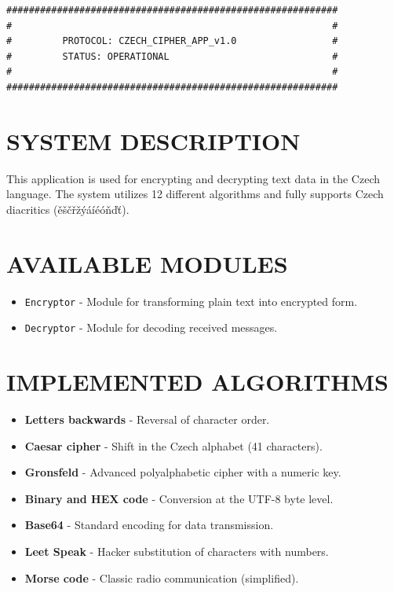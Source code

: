 \documentclass[12pt]{article}
\begin{document}
\large

\begin{center}
\begin{Verbatim}[formatcom=\color{text_zelena}, fontsize=\Large]
###########################################################
#                                                         #
#         PROTOCOL: CZECH_CIPHER_APP_v1.0                 #
#         STATUS: OPERATIONAL                             #
#                                                         #
###########################################################
\end{Verbatim}
\end{center}

\vspace{1cm}

\section{SYSTEM DESCRIPTION}
This application is used for encrypting and decrypting text data in the Czech language. The system utilizes 12 different algorithms and fully supports Czech diacritics (ěščřžýáíéóňďť).

\section{AVAILABLE MODULES}
\begin{itemize}
    \item \texttt{Encryptor} - Module for transforming plain text into encrypted form.
    \item \texttt{Decryptor} - Module for decoding received messages.
\end{itemize}

\section{IMPLEMENTED ALGORITHMS}
\begin{itemize}
    \item \textbf{Letters backwards} - Reversal of character order.
    \item \textbf{Caesar cipher} - Shift in the Czech alphabet (41 characters).
    \item \textbf{Gronsfeld} - Advanced polyalphabetic cipher with a numeric key.
    \item \textbf{Binary and HEX code} - Conversion at the UTF-8 byte level.
    \item \textbf{Base64} - Standard encoding for data transmission.
    \item \textbf{Leet Speak} - Hacker substitution of characters with numbers.
    \item \textbf{Morse code} - Classic radio communication (simplified).
\end{itemize}
\end{document}

